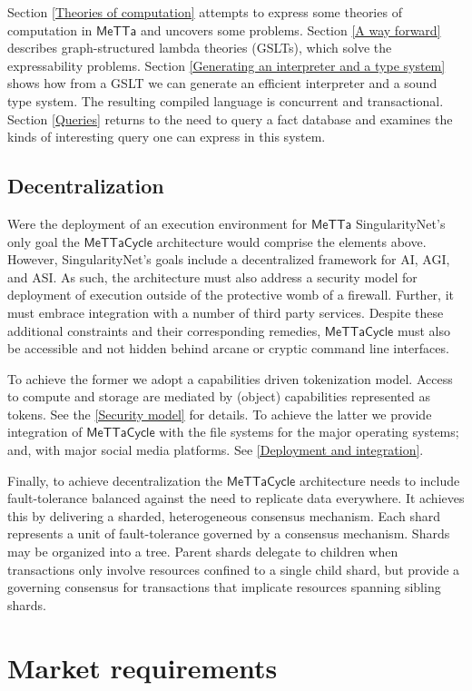\documentclass{article}
\newcommand{\MC}{\mathsf{MeTTaCycle}}
\begin{document}
Section \ref{Theories of computation} attempts to express some theories of computation in $\mathsf{MeTTa}$ and uncovers some problems.  Section \ref{A way forward} describes graph-structured lambda theories (GSLTs), which solve the expressability problems.  Section \ref{Generating an interpreter and a type system} shows how from a GSLT we can generate an efficient interpreter and a sound type system.  The resulting compiled language is concurrent and transactional. Section \ref{Queries} returns to the need to query a fact database and examines the kinds of interesting query one can express in this system.

\subsection{Decentralization}

Were the deployment of an execution environment for $\mathsf{MeTTa}$ SingularityNet's only goal the $\MC$ architecture would comprise the elements above. However, SingularityNet's goals include a decentralized framework for AI, AGI, and ASI. As such, the architecture must also address a security model for deployment of execution outside of the protective womb of a firewall. Further, it must embrace integration with a number of third party services. Despite these additional constraints and their corresponding remedies, $\MC$ must also be accessible and not hidden behind arcane or cryptic command line interfaces.

To achieve the former we adopt a capabilities driven tokenization model. Access to compute and storage are mediated by (object) capabilities represented as tokens. See the \ref{Security model} for details. To achieve the latter we provide integration of $\MC$ with the file systems for the major operating systems; and, with major social media platforms. See \ref{Deployment and integration}.

Finally, to achieve decentralization the $\MC$ architecture needs to include fault-tolerance balanced against the need to replicate data everywhere. It achieves this by delivering a sharded, heterogeneous consensus mechanism. Each shard represents a unit of fault-tolerance governed by a consensus mechanism. Shards may be organized into a tree. Parent shards delegate to children when transactions only involve resources confined to a single child shard, but provide a governing consensus for transactions that implicate resources spanning sibling shards.

\section{Market requirements}
\end{document}

